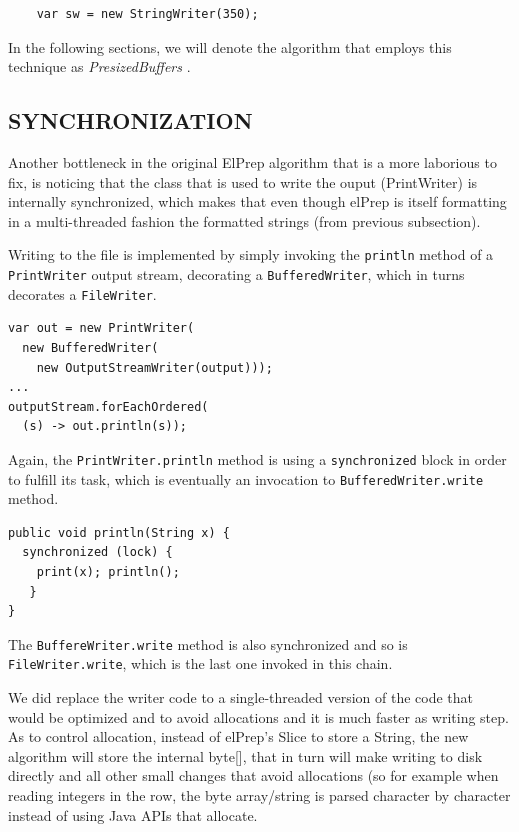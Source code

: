 \documentclass[a4paper,twoside]{article}
\begin{document}
\begin{verbatim}
    var sw = new StringWriter(350);
\end{verbatim}
In the following sections, we will denote the algorithm that employs this technique as {\textit{PresizedBuffers} }.


\subsection{\uppercase{Synchronization}}
\label{subsec:sync}

Another bottleneck in the original ElPrep algorithm that is a more laborious to fix, is noticing
that the class that is used to write the ouput (PrintWriter) is internally synchronized, which makes that
even though elPrep is itself formatting in a multi-threaded fashion the formatted strings (from previous subsection).

Writing to the file is implemented by simply invoking the {\texttt{println}} method of a {\texttt{PrintWriter}} output stream, decorating a {\texttt{BufferedWriter}}, which in turns decorates a {\texttt{FileWriter}}.
\begin{verbatim}
var out = new PrintWriter(
  new BufferedWriter(
    new OutputStreamWriter(output)));
...    
outputStream.forEachOrdered(
  (s) -> out.println(s));
\end{verbatim}

Again, the {\texttt{PrintWriter.println}} method is using a {\texttt{synchronized}} block in order to fulfill its task, which is eventually an invocation to {\texttt{BufferedWriter.write}} method.
\begin{verbatim}
public void println(String x) {
  synchronized (lock) {
    print(x); println();
   }
}
\end{verbatim}
The {\texttt{BuffereWriter.write}} method is also synchronized and so is {\texttt{FileWriter.write}}, which is the last one invoked in this chain.

We did replace the writer code to a single-threaded version of the code that would be optimized and to avoid allocations and it is much faster as writing step. As to control allocation, instead of elPrep's Slice to store a String, the new algorithm will store the internal byte[], that in turn will make writing to disk directly and all other small changes that avoid allocations (so for example when reading integers in the row, the byte array/string is parsed character by character instead of using Java APIs that allocate.
\end{document}
